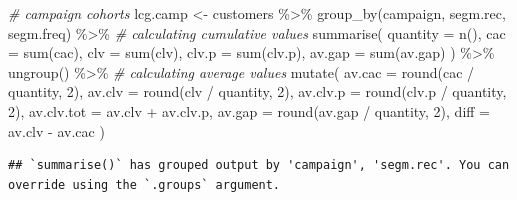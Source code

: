 \documentclass[
]{book}
\newenvironment{Shaded}{\begin{snugshade}}{\end{snugshade}}
\newcommand{\AttributeTok}[1]{\textcolor[rgb]{0.77,0.63,0.00}{#1}}
\newcommand{\CommentTok}[1]{\textcolor[rgb]{0.56,0.35,0.01}{\textit{#1}}}
\newcommand{\DecValTok}[1]{\textcolor[rgb]{0.00,0.00,0.81}{#1}}
\newcommand{\FunctionTok}[1]{\textcolor[rgb]{0.00,0.00,0.00}{#1}}
\newcommand{\NormalTok}[1]{#1}
\newcommand{\OtherTok}[1]{\textcolor[rgb]{0.56,0.35,0.01}{#1}}
\newcommand{\SpecialCharTok}[1]{\textcolor[rgb]{0.00,0.00,0.00}{#1}}
\begin{document}
\begin{Shaded}
\begin{Highlighting}[]
\CommentTok{\# campaign cohorts}
\NormalTok{lcg.camp }\OtherTok{\textless{}{-}}\NormalTok{ customers }\SpecialCharTok{\%\textgreater{}\%}
    \FunctionTok{group\_by}\NormalTok{(campaign, segm.rec, segm.freq) }\SpecialCharTok{\%\textgreater{}\%}
    \CommentTok{\# calculating cumulative values}
    \FunctionTok{summarise}\NormalTok{(}
        \AttributeTok{quantity =} \FunctionTok{n}\NormalTok{(),}
        \AttributeTok{cac =} \FunctionTok{sum}\NormalTok{(cac),}
        \AttributeTok{clv =} \FunctionTok{sum}\NormalTok{(clv),}
        \AttributeTok{clv.p =} \FunctionTok{sum}\NormalTok{(clv.p),}
        \AttributeTok{av.gap =} \FunctionTok{sum}\NormalTok{(av.gap)}
\NormalTok{    ) }\SpecialCharTok{\%\textgreater{}\%}
    \FunctionTok{ungroup}\NormalTok{() }\SpecialCharTok{\%\textgreater{}\%}
    \CommentTok{\# calculating average values}
    \FunctionTok{mutate}\NormalTok{(}
        \AttributeTok{av.cac =} \FunctionTok{round}\NormalTok{(cac }\SpecialCharTok{/}\NormalTok{ quantity, }\DecValTok{2}\NormalTok{),}
        \AttributeTok{av.clv =} \FunctionTok{round}\NormalTok{(clv }\SpecialCharTok{/}\NormalTok{ quantity, }\DecValTok{2}\NormalTok{),}
        \AttributeTok{av.clv.p =} \FunctionTok{round}\NormalTok{(clv.p }\SpecialCharTok{/}\NormalTok{ quantity, }\DecValTok{2}\NormalTok{),}
        \AttributeTok{av.clv.tot =}\NormalTok{ av.clv }\SpecialCharTok{+}\NormalTok{ av.clv.p,}
        \AttributeTok{av.gap =} \FunctionTok{round}\NormalTok{(av.gap }\SpecialCharTok{/}\NormalTok{ quantity, }\DecValTok{2}\NormalTok{),}
        \AttributeTok{diff =}\NormalTok{ av.clv }\SpecialCharTok{{-}}\NormalTok{ av.cac}
\NormalTok{    )}
\end{Highlighting}
\end{Shaded}

\begin{verbatim}
## `summarise()` has grouped output by 'campaign', 'segm.rec'. You can override using the `.groups` argument.
\end{verbatim}
\end{document}
